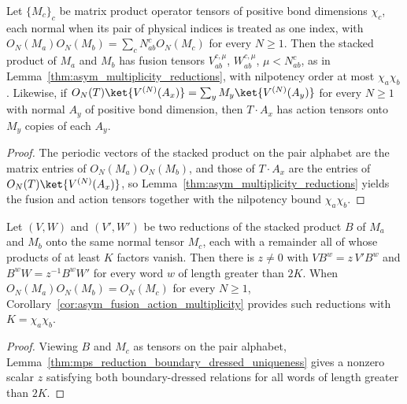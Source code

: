 \begin{corollary}
    \label{cor:asym_fusion_action_multiplicity}
    \leanok
    Let $\{M_c\}_c$ be matrix product operator tensors of positive bond
    dimensions $\chi_c$, each normal when its pair of physical indices is
    treated as one index, with
    $O_N(M_a)O_N(M_b)=\sum_cN_{ab}^cO_N(M_c)$ for every $N\geq1$. Then
    the stacked product of $M_a$ and $M_b$ has fusion tensors
    $V_{ab}^{c,\mu}$, $W_{ab}^{c,\mu}$, $\mu<N_{ab}^c$, as in
    Lemma~\ref{thm:asym_multiplicity_reductions}, with nilpotency order
    at most $\chi_a\chi_b$. Likewise, if
    $O_N(T)\ket{V^{(N)}(A_x)}=\sum_yM_y\ket{V^{(N)}(A_y)}$ for every
    $N\geq1$ with normal $A_y$ of positive bond dimension, then
    $T\cdot A_x$ has action tensors onto $M_y$ copies of each $A_y$.
\end{corollary}

\begin{proof}
    \leanok
    The periodic vectors of the stacked product on the pair alphabet are
    the matrix entries of $O_N(M_a)O_N(M_b)$, and those of $T\cdot A_x$
    are the entries of $O_N(T)\ket{V^{(N)}(A_x)}$, so
    Lemma~\ref{thm:asym_multiplicity_reductions} yields the fusion and
    action tensors together with the nilpotency bound $\chi_a\chi_b$.
\end{proof}

\begin{corollary}
    \label{cor:asym_fusion_gauge_single}
    \leanok
    Let $(V,W)$ and $(V',W')$ be two reductions of the stacked product $B$
    of $M_a$ and $M_b$ onto the same normal tensor $M_c$, each with a
    remainder all of whose products of at least $K$ factors vanish. Then
    there is $z\neq0$ with $VB^{w}=z\,V'B^{w}$ and
    $B^{w}W=z^{-1}B^{w}W'$ for every word $w$ of length greater than
    $2K$. When $O_N(M_a)O_N(M_b)=O_N(M_c)$ for every $N\geq1$,
    Corollary~\ref{cor:asym_fusion_action_multiplicity} provides such
    reductions with $K=\chi_a\chi_b$.
\end{corollary}

\begin{proof}
    \leanok
    Viewing $B$ and $M_c$ as tensors on the pair alphabet,
    Lemma~\ref{thm:mps_reduction_boundary_dressed_uniqueness} gives a
    nonzero scalar $z$ satisfying both boundary-dressed relations for all
    words of length greater than $2K$.
\end{proof}
